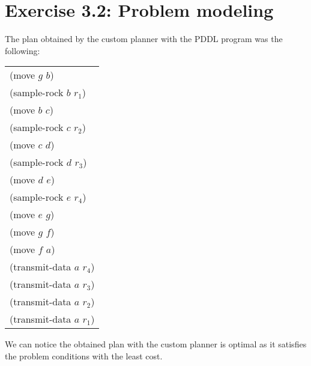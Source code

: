 \documentclass[12pt,a4paper]{article}
\begin{document}
\newpage
\section*{Exercise 3.2: Problem modeling}
The plan obtained by the custom planner with the PDDL program was the following:
\begin{center}
	\begin{tabular}{l}
	(move $g$ $b$)\\
	(sample-rock $b$ $r_1$)\\
	(move $b$ $c$)\\
	(sample-rock $c$ $r_2$)\\
	(move $c$ $d$)\\
	(sample-rock $d$ $r_3$)\\
	(move $d$ $e$)\\
	(sample-rock $e$ $r_4$)\\
	(move $e$ $g$)\\
	(move $g$ $f$)\\
	(move $f$ $a$)\\
	(transmit-data $a$ $r_4$)\\
	(transmit-data $a$ $r_3$)\\
	(transmit-data $a$ $r_2$)\\
	(transmit-data $a$ $r_1$)\\
	\end{tabular}
\end{center}
We can notice the obtained plan with the custom planner is optimal as it satisfies the problem conditions with the least cost.
\end{document}

